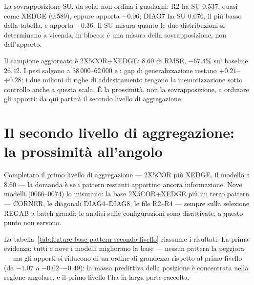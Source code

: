 La sovrapposizione SU, da sola, non ordina i guadagni: R2 ha SU
0.537, quasi come XEDGE (0.589), eppure apporta $-0.06$; DIAG7 ha
SU 0.076, il più basso della tabella, e apporta $-0.36$. Il SU
misura quanto le due distribuzioni si determinano a vicenda, in
blocco: è una misura della sovrapposizione, non dell'apporto.

Il campione aggiornato è 2X5COR+XEDGE: 8.60 di RMSE, $-67.4\%$ sul
baseline 26.42. I pesi salgono a 38\,000--62\,000 e i gap di
generalizzazione restano $+0.21$--$+0.28$: i due milioni di righe
di addestramento tengono la memorizzazione sotto controllo anche a
questa scala. È la prossimità, non la sovrapposizione, a ordinare
gli apporti: da qui partirà il secondo livello di aggregazione.

\section{Il secondo livello di aggregazione: la prossimità
all'angolo}

Completato il primo livello di aggregazione — 2X5COR più XEDGE, il
modello a 8.60 — la domanda è se i pattern restanti apportino ancora
informazione. Nove modelli (0066--0074) lo misurano: la base
2X5COR+XEDGE più un terzo pattern — CORNER, le diagonali
DIAG4--DIAG8, le file R2--R4 — sempre sulla selezione REGAB a batch
grandi; le analisi sulle configurazioni sono disattivate, a questo
punto non servono.

La tabella~\ref{tab:feature-base-pattern-secondo-livello} riassume
i risultati. La prima evidenza: tutti e nove i modelli migliorano la
base — nessun pattern la peggiora — ma gli apporti si riducono di un
ordine di grandezza rispetto al primo livello (da $-1.07$ a
$-0.02$--$-0.49$): la massa predittiva della posizione è concentrata
nella regione angolare, e il primo livello l'ha in larga parte
raccolta.

